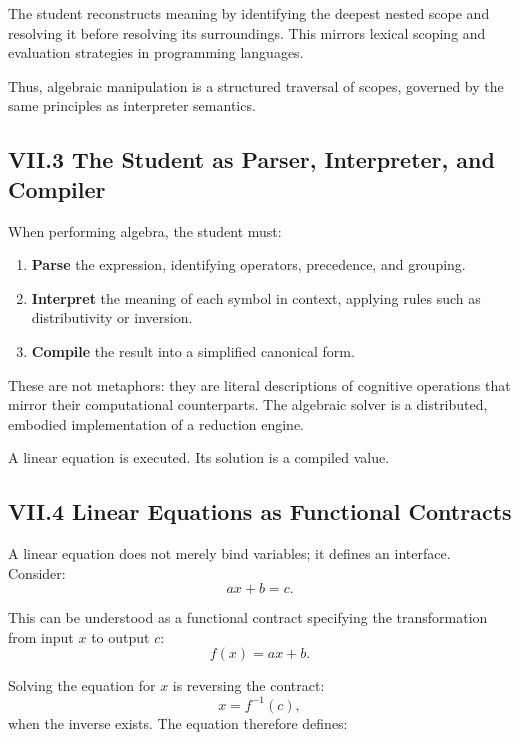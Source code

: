 \documentclass[12pt,letterpaper]{article}
\begin{document}
The student reconstructs meaning by identifying the deepest nested scope and resolving it before resolving its surroundings. This mirrors lexical scoping and evaluation strategies in programming languages.

Thus, algebraic manipulation is a structured traversal of scopes, governed by the same principles as interpreter semantics.

\subsection{VII.3 The Student as Parser, Interpreter, and Compiler}

When performing algebra, the student must:

\begin{enumerate}
    \item \textbf{Parse} the expression, identifying operators, precedence, and grouping.
    \item \textbf{Interpret} the meaning of each symbol in context, applying rules such as distributivity or inversion.
    \item \textbf{Compile} the result into a simplified canonical form.
\end{enumerate}

These are not metaphors: they are literal descriptions of cognitive operations that mirror their computational counterparts. The algebraic solver is a distributed, embodied implementation of a reduction engine.

A linear equation is executed. Its solution is a compiled value.

\subsection{VII.4 Linear Equations as Functional Contracts}

A linear equation does not merely bind variables; it defines an interface. Consider:
\[
ax + b = c.
\]

This can be understood as a functional contract specifying the transformation from input \(x\) to output \(c\):
\[
f(x) = ax + b.
\]

Solving the equation for \(x\) is reversing the contract:
\[
x = f^{-1}(c),
\]
when the inverse exists. The equation therefore defines:
\end{document}
